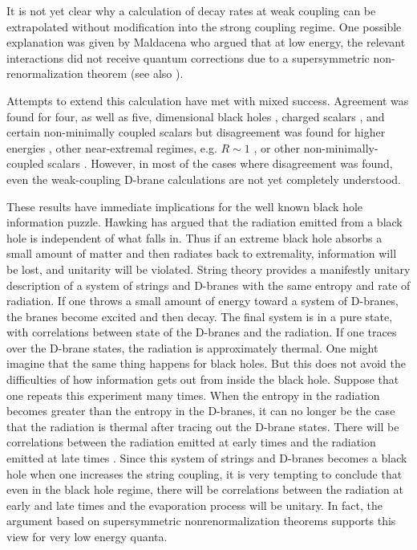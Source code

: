 It
is not yet clear why a calculation of decay rates at weak coupling can be
extrapolated without modification into the strong coupling regime. One
possible explanation was given by Maldacena \cite{mald} who argued that at low
energy, the relevant interactions did not receive quantum corrections due
to a supersymmetric non-renormalization theorem (see also \cite{das}).

Attempts to extend this calculation have met with mixed success.
Agreement was found for four, as well as five, dimensional black holes 
\cite{gukl}, charged scalars \cite{mast2,gukl},  and
certain non-minimally coupled scalars \cite{cgkt,krt} but disagreement was
found for higher energies \cite{deal,dkt}, other near-extremal
regimes, e.g. $R\sim 1$ \cite{hata,dkt}, or other non-minimally-coupled
scalars \cite{krkl}.
However, in  most of the cases where disagreement was found,
even the weak-coupling D-brane
calculations are not yet completely understood.

These results have immediate implications for the well known
black hole information puzzle. Hawking has argued that the radiation
emitted from a black hole is independent of what falls in. Thus if an
extreme black hole absorbs a small amount of matter and then radiates back
to extremality, information will be lost, and unitarity will be
violated.
String theory provides a manifestly unitary description of a
system of strings and D-branes with the same entropy and rate of radiation.
If one throws a small amount of energy toward a system of D-branes, the
branes become excited and then decay. The final system is in a pure state,
with correlations between state of the D-branes and the radiation. If
one traces over the D-brane states, the radiation is approximately
thermal.
One might imagine that the same thing happens for black holes. But this
does not avoid the difficulties of how information gets out from inside
the black hole. 
Suppose that one repeats this experiment many times. When the entropy in
the radiation becomes greater than the entropy in the D-branes, it can
no longer be the case that the radiation is thermal  after tracing out
the D-brane states. There will be  correlations between the radiation
emitted at early times and the radiation emitted at late times \cite{page2}.
Since this system of strings and D-branes becomes a black hole when
one increases the string coupling, 
it is very tempting to conclude that even in the black hole regime, there
will be correlations between the radiation at early and late times 
and the evaporation process will be unitary. 
In fact, the argument based on supersymmetric
nonrenormalization theorems \cite{mald} supports this view
for very low energy quanta.

